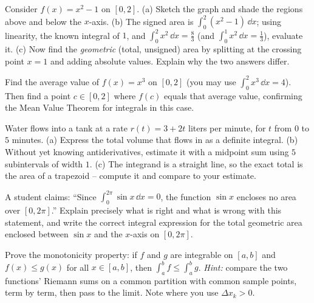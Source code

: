 \begin{exercise}
Consider $f(x) = x^2 - 1$ on $[0,2]$. (a) Sketch the graph and shade the regions
above and below the $x$-axis. (b) The signed area is $\int_0^2 (x^2-1)\,\dd x$;
using linearity, the known integral of $1$, and $\int_0^2 x^2\,\dd x = \tfrac{8}{3}$ (and $\int_0^1 x^2\,\dd x = \tfrac{1}{3}$), evaluate
it. (c) Now find the \emph{geometric} (total, unsigned) area by splitting at the
crossing point $x=1$ and adding absolute values. Explain why the two answers
differ.
\end{exercise}

\begin{exercise}
Find the average value of $f(x) = x^3$ on $[0,2]$ (you may use
$\int_0^2 x^3\,\dd x = 4$). Then find a point $c \in [0,2]$ where $f(c)$ equals
that average value, confirming the Mean Value Theorem for integrals in this case.
\end{exercise}

\begin{exercise}
Water flows into a tank at a rate $r(t) = 3 + 2t$ liters per minute, for $t$ from
$0$ to $5$ minutes. (a) Express the total volume that flows in as a definite
integral. (b) Without yet knowing antiderivatives, estimate it with a midpoint
sum using $5$ subintervals of width $1$. (c) The integrand is a straight line, so
the exact total is the area of a trapezoid -- compute it and compare to your
estimate.
\end{exercise}

\begin{exercise}
A student claims: ``Since $\int_0^{2\pi}\sin x\,\dd x = 0$, the function $\sin x$
encloses no area over $[0,2\pi]$.'' Explain precisely what is right and what is
wrong with this statement, and write the correct integral expression for the
total geometric area enclosed between $\sin x$ and the $x$-axis on $[0,2\pi]$.
\end{exercise}

\begin{exercise}
Prove the monotonicity property: if $f$ and $g$ are integrable on $[a,b]$ and
$f(x) \le g(x)$ for all $x \in [a,b]$, then $\int_a^b f \le \int_a^b g$.
\emph{Hint:} compare the two functions' Riemann sums on a common partition with
common sample points, term by term, then pass to the limit. Note where you use
$\Delta x_k > 0$.
\end{exercise}

